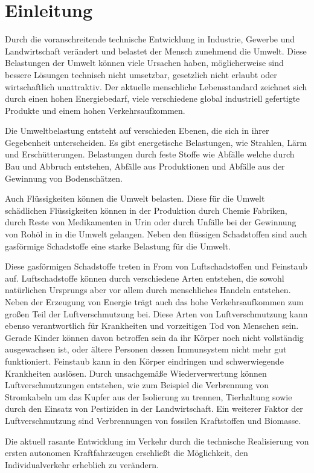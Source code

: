 \chapter{Einleitung}
Durch die voranschreitende technische Entwicklung in Industrie, Gewerbe und Landwirtschaft verändert und belastet der Mensch zunehmend die Umwelt.
Diese Belastungen der Umwelt können viele Ursachen haben,
möglicherweise sind bessere Lösungen technisch nicht umsetzbar,
gesetzlich nicht erlaubt oder wirtschaftlich unattraktiv.
Der aktuelle menschliche Lebensstandard zeichnet sich durch einen
hohen Energiebedarf, viele verschiedene global industriell gefertigte Produkte
und einem hohen Verkehrsaufkommen.

Die Umweltbelastung entsteht auf verschieden Ebenen, die sich in ihrer Gegebenheit unterscheiden.
Es gibt energetische Belastungen, wie Strahlen, Lärm und Erschütterungen.
Belastungen durch feste Stoffe wie Abfälle welche durch Bau und Abbruch entstehen,
Abfälle aus Produktionen und
Abfälle aus der Gewinnung von Bodenschätzen.

Auch Flüssigkeiten können die Umwelt belasten.
Diese für die Umwelt schädlichen Flüssigkeiten können 
in der Produktion durch Chemie Fabriken,
durch Reste von Medikamenten in Urin oder durch
Unfälle bei der Gewinnung von Rohöl in in die Umwelt gelangen.
Neben den flüssigen Schadstoffen sind auch gasförmige Schadstoffe eine starke Belastung für die Umwelt.

Diese gasförmigen Schadstoffe treten in From von Luftschadstoffen und Feinstaub auf.
Luftschadstoffe können durch verschiedene Arten entstehen, die sowohl natürlichen Ursprungs aber vor allem 
durch menschliches Handeln entstehen.
Neben der Erzeugung von Energie trägt auch das hohe Verkehrsaufkommen zum großen Teil der Luftverschmutzung bei.
Diese Arten von Luftverschmutzung kann ebenso verantwortlich für Krankheiten und vorzeitigen Tod von Menschen sein.
Gerade Kinder können davon betroffen sein da ihr Körper noch nicht vollständig ausgewachsen ist, 
oder ältere Personen dessen Immunsystem nicht mehr gut funktioniert.
Feinstaub kann in den Körper eindringen und schwerwiegende Krankheiten auslösen.
Durch unsachgemäße Wiederverwertung können Luftverschmutzungen entstehen,
wie zum Beispiel die Verbrennung von
Stromkabeln um das Kupfer aus der Isolierung zu trennen,
Tierhaltung sowie durch den Einsatz von Pestiziden in der Landwirtschaft.
Ein weiterer Faktor der Luftverschmutzung sind Verbrennungen von fossilen Kraftstoffen und Biomasse.

Die aktuell rasante Entwicklung im Verkehr durch die technische Realisierung von ersten autonomen Kraftfahrzeugen 
erschließt die Möglichkeit, den Individualverkehr erheblich zu verändern. 

